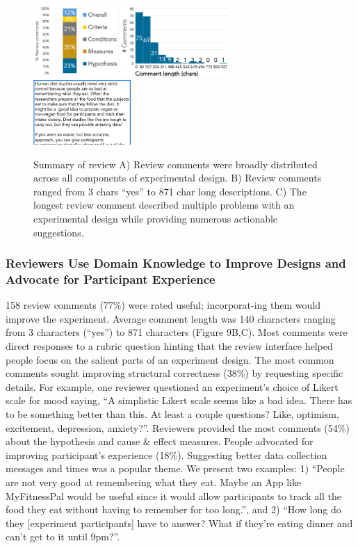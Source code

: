 \begin{figure}[h] 
  \includegraphics[width=0.66\textwidth]{figures/galileo/galileo-study2-2}
  \includegraphics[width=0.33\textwidth]{figures/galileo/galileo-study2-3}
  \caption[]
{Summary of review A) Review comments were broadly distributed across all components of experimental design. B) Review comments ranged from 3 chars “yes” to 871 char long descriptions. C) The longest review comment described multiple problems with an experimental design while providing numerous actionable suggestions. }
  \label{fig:galileo-result2-2}
\end{figure}

\subsubsection{Reviewers Use Domain Knowledge to Improve Designs and Advocate for Participant Experience}
158 review comments (77\%) were rated useful; incorporat-ing them would improve the experiment. Average comment length was 140 characters ranging from 3 characters (“yes”) to 871 characters (Figure 9B,C). Most comments were direct responses to a rubric question hinting that the review interface helped people focus on the salient parts of an experiment design.
The most common comments sought improving structural correctness (38\%) by requesting specific details. For example, one reviewer questioned an experiment’s choice of Likert scale for mood saying, “A simplistic Likert scale seems like a bad idea. There has to be something better than this. At least a couple questions? Like, optimism, excitement, depression, anxiety?”. Reviewers provided the most comments (54\%) about the hypothesis and cause \& effect measures. People advocated for improving participant’s experience (18\%). Suggesting better data collection messages and times was a popular theme. We present two examples: 1) “People are not very good at remembering what they eat. Maybe an App like MyFitnessPal would be useful since it would allow participants to track all the food they eat without having to remember for too long.”, and 2) “How long do they [experiment participants] have to answer? What if they're eating dinner and can't get to it until 9pm?”.

